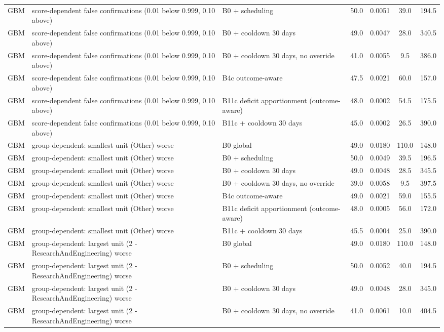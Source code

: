 \documentclass[10pt,onecolumn,letterpaper]{article}
\begin{document}
\begin{longtable}{lp{5.2cm}p{4.4cm}cccc}
GBM & score-dependent false confirmations (0.01 below 0.999, 0.10 above) & B0 + scheduling & 50.0 & 0.0051 & 39.0 & 194.5 \\
GBM & score-dependent false confirmations (0.01 below 0.999, 0.10 above) & B0 + cooldown 30 days & 49.0 & 0.0047 & 28.0 & 340.5 \\
GBM & score-dependent false confirmations (0.01 below 0.999, 0.10 above) & B0 + cooldown 30 days, no override & 41.0 & 0.0055 & 9.5 & 386.0 \\
GBM & score-dependent false confirmations (0.01 below 0.999, 0.10 above) & B4c outcome-aware & 47.5 & 0.0021 & 60.0 & 157.0 \\
GBM & score-dependent false confirmations (0.01 below 0.999, 0.10 above) & B11c deficit apportionment (outcome-aware) & 48.0 & 0.0002 & 54.5 & 175.5 \\
GBM & score-dependent false confirmations (0.01 below 0.999, 0.10 above) & B11c + cooldown 30 days & 45.0 & 0.0002 & 26.5 & 390.0 \\
GBM & group-dependent: smallest unit (Other) worse & B0 global & 49.0 & 0.0180 & 110.0 & 148.0 \\
GBM & group-dependent: smallest unit (Other) worse & B0 + scheduling & 50.0 & 0.0049 & 39.5 & 196.5 \\
GBM & group-dependent: smallest unit (Other) worse & B0 + cooldown 30 days & 49.0 & 0.0048 & 28.5 & 345.5 \\
GBM & group-dependent: smallest unit (Other) worse & B0 + cooldown 30 days, no override & 39.0 & 0.0058 & 9.5 & 397.5 \\
GBM & group-dependent: smallest unit (Other) worse & B4c outcome-aware & 49.0 & 0.0021 & 59.0 & 155.5 \\
GBM & group-dependent: smallest unit (Other) worse & B11c deficit apportionment (outcome-aware) & 48.0 & 0.0005 & 56.0 & 172.0 \\
GBM & group-dependent: smallest unit (Other) worse & B11c + cooldown 30 days & 45.5 & 0.0004 & 25.0 & 390.0 \\
GBM & group-dependent: largest unit (2 - ResearchAndEngineering) worse & B0 global & 49.0 & 0.0180 & 110.0 & 148.0 \\
GBM & group-dependent: largest unit (2 - ResearchAndEngineering) worse & B0 + scheduling & 50.0 & 0.0052 & 40.0 & 194.5 \\
GBM & group-dependent: largest unit (2 - ResearchAndEngineering) worse & B0 + cooldown 30 days & 49.0 & 0.0048 & 28.0 & 345.0 \\
GBM & group-dependent: largest unit (2 - ResearchAndEngineering) worse & B0 + cooldown 30 days, no override & 41.0 & 0.0061 & 10.0 & 404.5 \\

\end{longtable}
\end{document}

